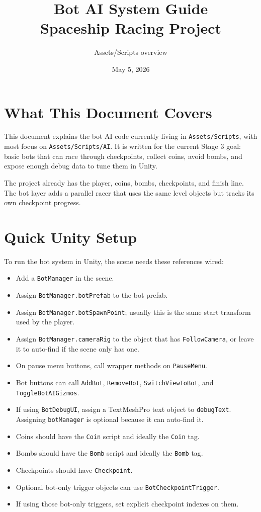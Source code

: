 \documentclass[11pt]{article}
\title{\textbf{Bot AI System Guide}\\Spaceship Racing Project}
\author{Assets/Scripts overview}
\date{May 5, 2026}
\newcommand{\file}[1]{\texttt{#1}}
\newcommand{\code}[1]{{\footnotesize\texttt{#1}}}
\begin{document}
\maketitle
\tableofcontents
\newpage

\section{What This Document Covers}

This document explains the bot AI code currently living in \file{Assets/Scripts}, with most focus on \file{Assets/Scripts/AI}. It is written for the current Stage 3 goal: basic bots that can race through checkpoints, collect coins, avoid bombs, and expose enough debug data to tune them in Unity.

The project already has the player, coins, bombs, checkpoints, and finish line. The bot layer adds a parallel racer that uses the same level objects but tracks its own checkpoint progress.

\section{Quick Unity Setup}

To run the bot system in Unity, the scene needs these references wired:

\begin{itemize}
    \item Add a \code{BotManager} in the scene.
    \item Assign \code{BotManager.botPrefab} to the bot prefab.
    \item Assign \code{BotManager.botSpawnPoint}; usually this is the same start transform used by the player.
    \item Assign \code{BotManager.cameraRig} to the object that has \code{FollowCamera}, or leave it to auto-find if the scene only has one.
    \item On pause menu buttons, call wrapper methods on \code{PauseMenu}.
    \item Bot buttons can call \code{AddBot}, \code{RemoveBot}, \code{SwitchViewToBot}, and \code{ToggleBotAIGizmos}.
    \item If using \code{BotDebugUI}, assign a TextMeshPro text object to \code{debugText}. Assigning \code{botManager} is optional because it can auto-find it.
    \item Coins should have the \code{Coin} script and ideally the \code{Coin} tag.
    \item Bombs should have the \code{Bomb} script and ideally the \code{Bomb} tag.
    \item Checkpoints should have \code{Checkpoint}.
    \item Optional bot-only trigger objects can use \code{BotCheckpointTrigger}.
    \item If using those bot-only triggers, set explicit checkpoint indexes on them.
\end{itemize}
\end{document}
